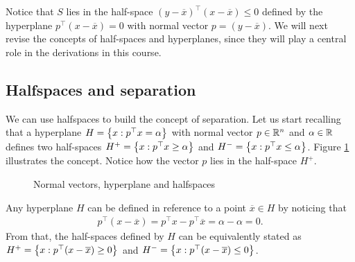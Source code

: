 Notice that $S$ lies in the half-space $(y-\overline{x})^\top(x - \overline{x}) \leq 0$ defined by the hyperplane $p^\top(x - \overline{x}) =0$ with normal vector $p = (y - \overline{x})$. We will next revise the concepts of half-spaces and hyperplanes, since they will play a central role in the derivations in this course.  

\subsection{Halfspaces and separation}

We can use halfspaces to build the concept of separation. Let us start recalling that a hyperplane $H = \left\{ x : p^\top x = \alpha \right \}$ with normal vector $p \in \mathbb{R}^n$ and $\alpha \in \mathbb{R}$ defines two half-spaces $H^+ = \left\{ x : p^\top x \geq \alpha \right \}$ and $H^- = \left\{ x : p^\top x \leq \alpha \right \}$. Figure \ref{fig:hyperplane} illustrates the concept. Notice how the vector $p$ lies in the half-space $H^+$.
%
\begin{figure}
	\caption{Normal vectors, hyperplane and halfspaces} \label{fig:hyperplane}
\end{figure}
 
Any hyperplane $H$ can be defined in reference to a point $\overline{x} \in H$ by noticing that 
%
\begin{align*}
	p^\top(x - \overline{x}) = p^\top x - p^\top \overline{x} = \alpha - \alpha = 0.  
\end{align*}
%
From that, the half-spaces defined by $H$ can be equivalently stated as $H^+ = \left\{ x : p^\top (x - \overline{x}) \geq 0 \right \}$ and $H^- = \left\{ x : p^\top (x - \overline{x}) \leq 0 \right \}$.

